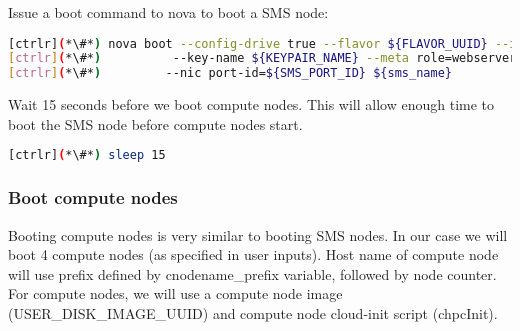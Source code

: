 	Issue a boot command to nova to boot a SMS node:


\begin{lstlisting}[language=bash,keywords={}]
[ctrlr](*\#*) nova boot --config-drive true --flavor ${FLAVOR_UUID} --image ${SMS_DISK_IMAGE_UUID} \
[ctrlr](*\#*)          --key-name ${KEYPAIR_NAME} --meta role=webservers --user-data=$chpcSMSInit \
[ctrlr](*\#*)         --nic port-id=${SMS_PORT_ID} ${sms_name}
\end{lstlisting} 

	Wait 15 seconds before we boot compute nodes. This will allow enough time to boot the SMS node before compute nodes start. 


\begin{lstlisting}[language=bash,keywords={}]
[ctrlr](*\#*) sleep 15
\end{lstlisting} 

\newpage
\subsubsection{Boot compute nodes}

	Booting compute nodes is very similar to booting SMS nodes. In our case we will boot 4 compute nodes (as specified in user inputs). Host name of compute node will use prefix defined by cnodename\_prefix variable, followed by node counter. For compute nodes, we will use a compute node image (USER\_DISK\_IMAGE\_UUID) and compute node cloud-init script (chpcInit). 


